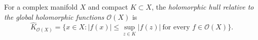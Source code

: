 
For a complex manifold $X$ and compact $K\subset X$, the \emph{holomorphic hull relative to the global holomorphic functions $\mathcal O(X)$} is
\[
\widehat K_{\mathcal O(X)}=\{x\in X:|f(x)|\le\sup_{z\in K}|f(z)|\ \text{for every }f\in\mathcal O(X)\}.
\]
